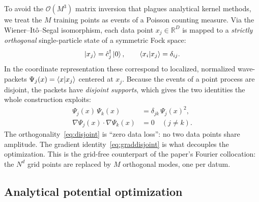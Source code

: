 \documentclass[11pt, a4paper]{article}
\newcommand{\Rset}{\mathbb{R}}
\begin{document}
To avoid the $\mathcal{O}(M^3)$ matrix inversion that plagues analytical kernel
methods, we treat the $M$ training points as events of a Poisson counting
measure. Via the Wiener--It\^o--Segal isomorphism, each data point
$x_j\in\Rset^D$ is mapped to a \emph{strictly orthogonal} single-particle
state of a symmetric Fock space:
\begin{equation}
  \ket{x_j}=\hat c_j^\dagger\ket{0},\qquad
  \braket{x_i | x_j}=\delta_{ij}.
\end{equation}
In the coordinate representation these correspond to localized, normalized
wave-packets $\Psi_j(x)=\braket{x | x_j}$ centered at $x_j$. Because the
events of a point process are disjoint, the packets have \emph{disjoint
supports}, which gives the two identities the whole construction exploits:
\begin{align}
  \Psi_j(x)\,\Psi_k(x)&=\delta_{jk}\,\Psi_j(x)^2,
  \label{eq:disjoint}\\
  \nabla\Psi_j(x)\cdot\nabla\Psi_k(x)&=0\quad(j\neq k).
  \label{eq:graddisjoint}
\end{align}
The orthogonality~\eqref{eq:disjoint} is ``zero data loss'': no two data points
share amplitude. The gradient identity~\eqref{eq:graddisjoint} is what
decouples the optimization. This is the grid-free counterpart of the paper's
Fourier collocation: the $N^d$ grid points are replaced by $M$ orthogonal
modes, one per datum.

\subsection{Analytical potential optimization}
\end{document}
